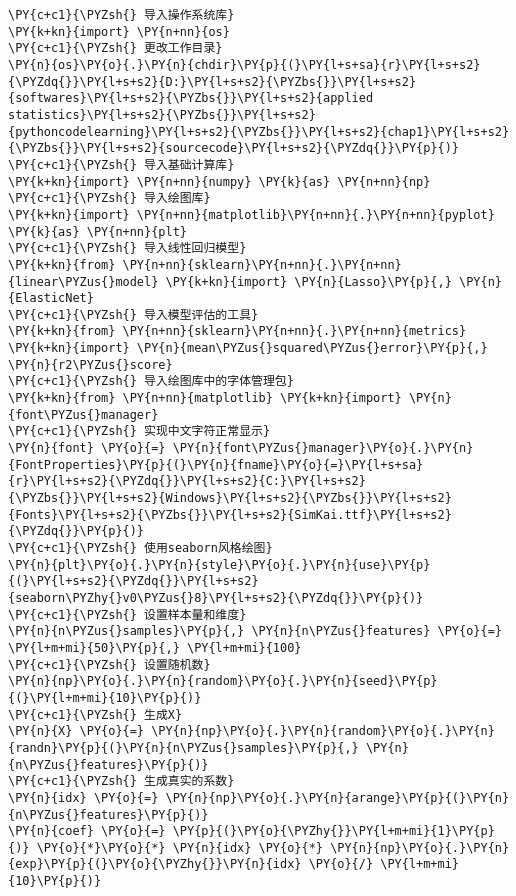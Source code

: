 \begin{Verbatim}[commandchars=\\\{\}]
\PY{c+c1}{\PYZsh{} 导入操作系统库}
\PY{k+kn}{import} \PY{n+nn}{os}
\PY{c+c1}{\PYZsh{} 更改工作目录}
\PY{n}{os}\PY{o}{.}\PY{n}{chdir}\PY{p}{(}\PY{l+s+sa}{r}\PY{l+s+s2}{\PYZdq{}}\PY{l+s+s2}{D:}\PY{l+s+s2}{\PYZbs{}}\PY{l+s+s2}{softwares}\PY{l+s+s2}{\PYZbs{}}\PY{l+s+s2}{applied statistics}\PY{l+s+s2}{\PYZbs{}}\PY{l+s+s2}{pythoncodelearning}\PY{l+s+s2}{\PYZbs{}}\PY{l+s+s2}{chap1}\PY{l+s+s2}{\PYZbs{}}\PY{l+s+s2}{sourcecode}\PY{l+s+s2}{\PYZdq{}}\PY{p}{)}
\PY{c+c1}{\PYZsh{} 导入基础计算库}
\PY{k+kn}{import} \PY{n+nn}{numpy} \PY{k}{as} \PY{n+nn}{np}
\PY{c+c1}{\PYZsh{} 导入绘图库}
\PY{k+kn}{import} \PY{n+nn}{matplotlib}\PY{n+nn}{.}\PY{n+nn}{pyplot} \PY{k}{as} \PY{n+nn}{plt}
\PY{c+c1}{\PYZsh{} 导入线性回归模型}
\PY{k+kn}{from} \PY{n+nn}{sklearn}\PY{n+nn}{.}\PY{n+nn}{linear\PYZus{}model} \PY{k+kn}{import} \PY{n}{Lasso}\PY{p}{,} \PY{n}{ElasticNet}
\PY{c+c1}{\PYZsh{} 导入模型评估的工具}
\PY{k+kn}{from} \PY{n+nn}{sklearn}\PY{n+nn}{.}\PY{n+nn}{metrics} \PY{k+kn}{import} \PY{n}{mean\PYZus{}squared\PYZus{}error}\PY{p}{,} \PY{n}{r2\PYZus{}score}
\PY{c+c1}{\PYZsh{} 导入绘图库中的字体管理包}
\PY{k+kn}{from} \PY{n+nn}{matplotlib} \PY{k+kn}{import} \PY{n}{font\PYZus{}manager}
\PY{c+c1}{\PYZsh{} 实现中文字符正常显示}
\PY{n}{font} \PY{o}{=} \PY{n}{font\PYZus{}manager}\PY{o}{.}\PY{n}{FontProperties}\PY{p}{(}\PY{n}{fname}\PY{o}{=}\PY{l+s+sa}{r}\PY{l+s+s2}{\PYZdq{}}\PY{l+s+s2}{C:}\PY{l+s+s2}{\PYZbs{}}\PY{l+s+s2}{Windows}\PY{l+s+s2}{\PYZbs{}}\PY{l+s+s2}{Fonts}\PY{l+s+s2}{\PYZbs{}}\PY{l+s+s2}{SimKai.ttf}\PY{l+s+s2}{\PYZdq{}}\PY{p}{)}
\PY{c+c1}{\PYZsh{} 使用seaborn风格绘图}
\PY{n}{plt}\PY{o}{.}\PY{n}{style}\PY{o}{.}\PY{n}{use}\PY{p}{(}\PY{l+s+s2}{\PYZdq{}}\PY{l+s+s2}{seaborn\PYZhy{}v0\PYZus{}8}\PY{l+s+s2}{\PYZdq{}}\PY{p}{)}
\PY{c+c1}{\PYZsh{} 设置样本量和维度}
\PY{n}{n\PYZus{}samples}\PY{p}{,} \PY{n}{n\PYZus{}features} \PY{o}{=} \PY{l+m+mi}{50}\PY{p}{,} \PY{l+m+mi}{100}
\PY{c+c1}{\PYZsh{} 设置随机数}
\PY{n}{np}\PY{o}{.}\PY{n}{random}\PY{o}{.}\PY{n}{seed}\PY{p}{(}\PY{l+m+mi}{10}\PY{p}{)}
\PY{c+c1}{\PYZsh{} 生成X}
\PY{n}{X} \PY{o}{=} \PY{n}{np}\PY{o}{.}\PY{n}{random}\PY{o}{.}\PY{n}{randn}\PY{p}{(}\PY{n}{n\PYZus{}samples}\PY{p}{,} \PY{n}{n\PYZus{}features}\PY{p}{)}
\PY{c+c1}{\PYZsh{} 生成真实的系数}
\PY{n}{idx} \PY{o}{=} \PY{n}{np}\PY{o}{.}\PY{n}{arange}\PY{p}{(}\PY{n}{n\PYZus{}features}\PY{p}{)}
\PY{n}{coef} \PY{o}{=} \PY{p}{(}\PY{o}{\PYZhy{}}\PY{l+m+mi}{1}\PY{p}{)} \PY{o}{*}\PY{o}{*} \PY{n}{idx} \PY{o}{*} \PY{n}{np}\PY{o}{.}\PY{n}{exp}\PY{p}{(}\PY{o}{\PYZhy{}}\PY{n}{idx} \PY{o}{/} \PY{l+m+mi}{10}\PY{p}{)}

\end{Verbatim}

